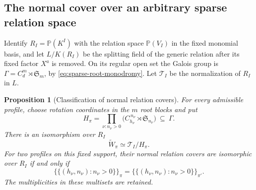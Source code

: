 \documentclass[10pt,fleqn]{article}
\numberwithin{equation}{section}
\newtheorem{proposition}[theorem]{Proposition}
\newcommand{\PP}{\mathbb P}
\begin{document}
\subsection{The normal cover over an arbitrary sparse relation space}

Identify $R_I=\PP(K^I)$ with the relation space $\PP(V_I)$ in the
fixed monomial basis, and let $L/K(R_I)$
be the splitting field of the generic relation after its fixed factor
$X^a$ is removed.  On its regular open set the Galois group is
$\Gamma=C_d^m\rtimes\mathfrak S_m$, by
\eqref{eq:sparse-root-monodromy}.  Let $\mathcal T_I$ be the
normalization of $R_I$ in $L$.

\begin{proposition}[Classification of normal relation covers]
\label{v6:norm:cover}
For every admissible profile, choose rotation coordinates in the $m$
root blocks and put
\begin{equation}\label{v6:norm:stabilizer}
 H_\pi=\prod_{\nu:n_\nu>0}
       \bigl(C_{h_\nu}^{\,n_\nu}\rtimes\mathfrak S_{n_\nu}\bigr)
       \ \subseteq\ \Gamma.
\end{equation}
There is an isomorphism over $R_I$
\begin{equation}\label{v6:norm:cover-quotient}
 \widetilde W_\pi\simeq\mathcal T_I/H_\pi.
\end{equation}
For two profiles on this fixed support, their normal relation covers
are isomorphic over $R_I$ if and only if
\begin{equation}\label{v6:norm:cover-classification}
 \{\!\{(h_\nu,n_\nu):n_\nu>0\}\!\}_\pi
 =
 \{\!\{(h_\nu,n_\nu):n_\nu>0\}\!\}_{\pi'}.
\end{equation}
The multiplicities in these multisets are retained.
\end{proposition}
\end{document}
